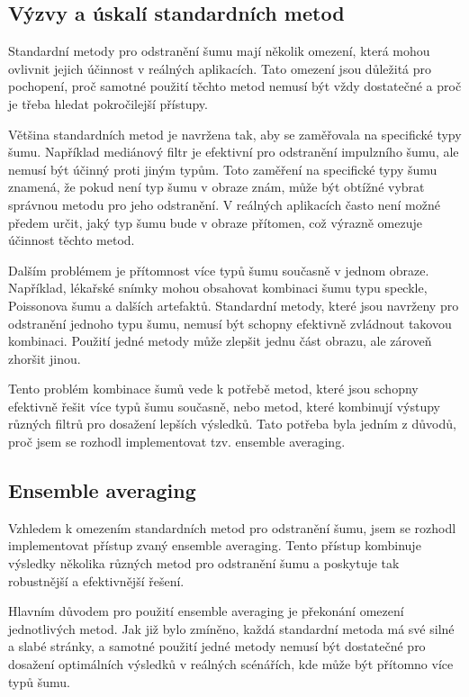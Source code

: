 \documentclass[male,czech,api_ing]{thesis}
\begin{document}
\subsection{Výzvy a úskalí standardních metod}
Standardní metody pro odstranění šumu mají několik omezení, která mohou ovlivnit jejich účinnost v reálných aplikacích. Tato omezení jsou důležitá pro pochopení, proč samotné použití těchto metod nemusí být vždy dostatečné a proč je třeba hledat pokročilejší přístupy.

Většina standardních metod je navržena tak, aby se zaměřovala na specifické typy šumu. Například mediánový filtr je efektivní pro odstranění impulzního šumu, ale nemusí být účinný proti jiným typům. Toto zaměření na specifické typy šumu znamená, že pokud není typ šumu v obraze znám, může být obtížné vybrat správnou metodu pro jeho odstranění. V reálných aplikacích často není možné předem určit, jaký typ šumu bude v obraze přítomen, což výrazně omezuje účinnost těchto metod.

Dalším problémem je přítomnost více typů šumu současně v jednom obraze. Například, lékařské snímky mohou obsahovat kombinaci šumu typu speckle, Poissonova šumu a dalších artefaktů. Standardní metody, které jsou navrženy pro odstranění jednoho typu šumu, nemusí být schopny efektivně zvládnout takovou kombinaci. Použití jedné metody může zlepšit jednu část obrazu, ale zároveň zhoršit jinou.

Tento problém kombinace šumů vede k potřebě metod, které jsou schopny efektivně řešit více typů šumu současně, nebo metod, které kombinují výstupy různých filtrů pro dosažení lepších výsledků. Tato potřeba byla jedním z důvodů, proč jsem se rozhodl implementovat tzv. ensemble averaging.

\subsection{Ensemble averaging}
Vzhledem k omezením standardních metod pro odstranění šumu, jsem se rozhodl implementovat přístup zvaný ensemble averaging. Tento přístup kombinuje výsledky několika různých metod pro odstranění šumu a poskytuje tak robustnější a efektivnější řešení.

Hlavním důvodem pro použití ensemble averaging je překonání omezení jednotlivých metod. Jak již bylo zmíněno, každá standardní metoda má své silné a slabé stránky, a samotné použití jedné metody nemusí být dostatečné pro dosažení optimálních výsledků v reálných scénářích, kde může být přítomno více typů šumu.
\end{document}
